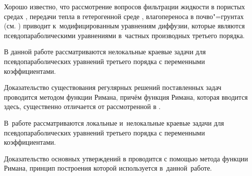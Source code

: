 


\date{10/I/2013} %









\maketitle





Хорошо известно, что рассмотрение вопросов фильтрации жидкости в пористых средах \cite{besh:bib:Barenblat, besh:bib:Dzekzer}, передачи тепла в гетерогенной среде \cite{besh:bib:Rubinshtein, besh:bib:TingCooling}, влагопереноса в почво"=грунтах \cite{besh:bib:Hallaire} (см. \cite[c. 137]{besh:bib:Chudnovsky}) приводит к~модифицированным уравнениям диффузии, которые являются псевдопараболическими уравнениями в~частных производных третьего порядка.



В данной работе рассматриваются нелокальные краевые задачи для псевдопараболических уравнений третьего порядка с переменными коэффициентами. 

Доказательство существования регулярных решений поставленных задач проводится методом функции Римана, причём функция Римана, которая вводится здесь, существенно отличается от рассмотренной в \cite{besh:bib:Colton, besh:bib:Colton2}. 

В~работе \cite{besh:bib:Shhanukov} рассматриваются локальные и~нелокальные краевые задачи для псевдопараболических уравнений третьего порядка с переменными коэффициентами. 

Доказательство основных утверждений в \cite{besh:bib:Shhanukov} проводится с помощью метода функции Римана, принцип построения которой используется \mbox{в данной работе.}



\smallskip




